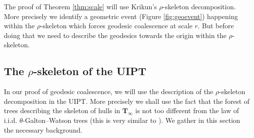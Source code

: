 \documentclass[10pt]{amsart}
\theoremstyle{definition}\newtheorem{defi}[theo]{Definition}\newtheorem{rema}[theo]{Remark}\newtheorem{exam}[theo]{Example}\newtheorem{exem}[theo]{Example}\newtheorem{nota}[theo]{Notation}
\begin{document}
	

The proof of Theorem \ref{thm:scale} will use Krikun's $\rho$-skeleton decomposition. More precisely we identify a geometric event (Figure \ref{fig:geoevent}) happening within the $\rho$-skeleton which forces geodesic coalescence at scale $r$. But before doing that we need to describe the geodesics towards the origin within the $\rho$-skeleton.


\subsection{The \texorpdfstring{$\rho$-}{rho-}skeleton of the UIPT}

In our proof of geodesic coalescence, we will use the description of the $\rho$-skeleton decomposition in the UIPT. More precisely we shall use the fact that the forest of trees describing the skeleton of hulls in $ \mathbf{T}_{\infty}$ is not too different from the law of i.i.d. $\theta$-Galton--{Watson} trees (this is very similar to \cite[Proposition 5]{CLGfpp}). We gather in this section the necessary background.\medskip
\end{document}

